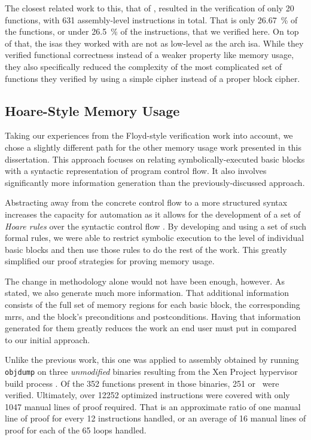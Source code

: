 The closest related work to this, that of \textcite{matthews2006verification}, resulted in the verification of only \num{20} functions, with \num{631} assembly-level instructions in total.
That is only \SI{26.67}{\percent} of the functions, or under \SI{26.5}{\percent} of the instructions, that we verified here.
On top of that, the \acp{isa} they worked with are not as low-level as the \gls{arch} \ac{isa}.
While they verified functional correctness instead of a weaker property like memory usage, they also specifically reduced the complexity of the most complicated set of functions they verified by using a simple  cipher instead of a proper block cipher.

\subsection{Hoare-Style Memory Usage}
Taking our experiences from the Floyd-style verification work into account, we chose a slightly different path for the other memory usage work presented in this dissertation.
This approach focuses on relating symbolically-executed basic blocks with a syntactic representation of program control flow.
It also involves significantly more information generation than the previously-discussed approach.

Abstracting away from the concrete control flow to a more structured syntax increases the capacity for automation as it allows for the development of a set of \emph{Hoare rules}
over the syntactic control flow \autocite{hoare1969axiomatic}.
By developing and using a set of such formal rules, we were able to restrict symbolic execution to the level of individual basic blocks and then use those rules to do the rest of the work.
This greatly simplified our proof strategies for proving memory usage.

The change in methodology alone would not have been enough, however.
As stated, we also generate much more information.
That additional information consists of the full set of memory regions for each basic block, the corresponding \acp{mrr}, and the block's preconditions and postconditions.
Having that information generated for them greatly reduces the work an end user must put in compared to our initial approach.

Unlike the previous work, this one was applied to assembly obtained by running \texttt{objdump} on three \emph{unmodified} binaries resulting from the Xen Project hypervisor build process \autocite{chisnall2008definitive}.
Of the \num{352} functions present in those binaries, \num{251} or \xenpercentage\ were verified.
Ultimately, over \num{12252} optimized instructions were covered with only \num{1047} manual lines of proof required.
That is an approximate ratio of one manual line of proof for every \num{12} instructions handled, or an average of \num{16} manual lines of proof for each of the \num{65} loops handled.


